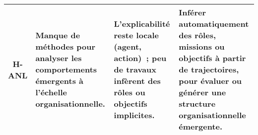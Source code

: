 \begin{table}[ht]
{\begin{tabularx}{\textwidth}{cXXX}
      \textbf{H-ANL} & Manque de méthodes pour analyser les comportements émergents à l'échelle organisationnelle.                                                               & L'explicabilité reste locale (agent, action)~; peu de travaux infèrent des rôles ou objectifs implicites.                                                                                                                            & Inférer automatiquement des rôles, missions ou objectifs à partir de trajectoires, pour évaluer ou générer une structure organisationnelle émergente.                                                                                                    \\
      \hline
    \end{tabularx}
  }
\end{table}
